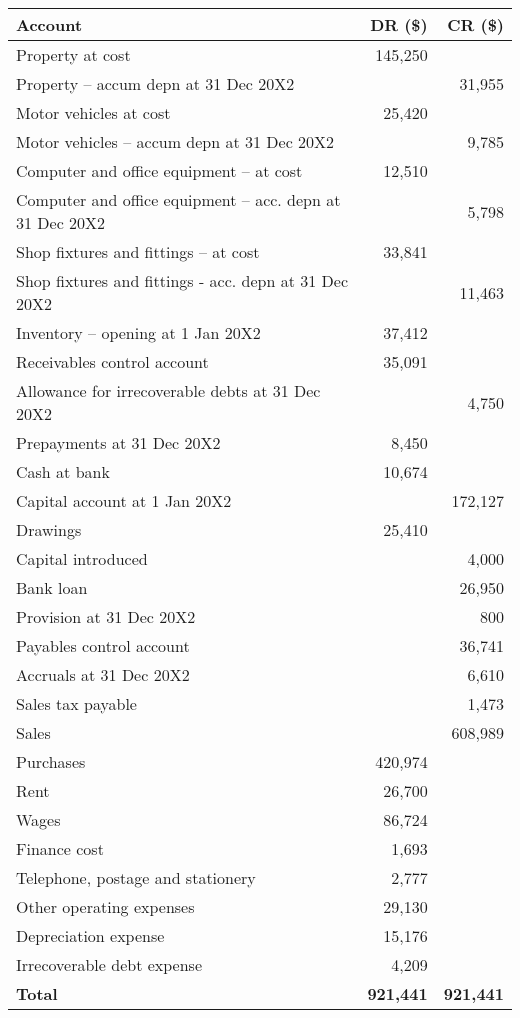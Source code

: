 \begin{tabular}{lrr}
\toprule
\textbf{Account} & \textbf{DR (\$)} & \textbf{CR (\$)} \\
\midrule
Property at cost & 145,250 & \\
Property – accum depn at 31 Dec 20X2 & & 31,955 \\
Motor vehicles at cost & 25,420 & \\
Motor vehicles – accum depn at 31 Dec 20X2 & & 9,785 \\
Computer and office equipment – at cost & 12,510 & \\
Computer and office equipment – acc. depn at 31 Dec 20X2 & & 5,798 \\
Shop fixtures and fittings – at cost & 33,841 & \\
Shop fixtures and fittings - acc. depn at 31 Dec 20X2 & & 11,463 \\
Inventory – opening at 1 Jan 20X2 & 37,412 & \\
Receivables control account & 35,091 & \\
Allowance for irrecoverable debts at 31 Dec 20X2 & & 4,750 \\
Prepayments at 31 Dec 20X2 & 8,450 & \\
Cash at bank & 10,674 & \\
Capital account at 1 Jan 20X2 & & 172,127 \\
Drawings & 25,410 & \\
Capital introduced & & 4,000 \\
Bank loan & & 26,950 \\
Provision at 31 Dec 20X2 & & 800 \\
Payables control account & & 36,741 \\
Accruals at 31 Dec 20X2 & & 6,610 \\
Sales tax payable & & 1,473 \\
Sales & & 608,989 \\
Purchases & 420,974 & \\
Rent & 26,700 & \\
Wages & 86,724 & \\
Finance cost & 1,693 & \\
Telephone, postage and stationery & 2,777 & \\
Other operating expenses & 29,130 & \\
Depreciation expense & 15,176 & \\
Irrecoverable debt expense & 4,209 & \\
\textbf{Total} & \textbf{921,441} & \textbf{921,441} \\
\bottomrule
\end{tabular}

